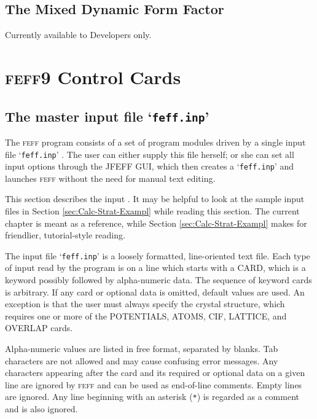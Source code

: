 \documentclass[11pt,oneside]{report} %
\newcommand{\program}[1]{\textsc{#1}}
\newcommand{\feff}{\program{feff}}
\newcommand{\vnum}{9}
\newcommand{\feffcur}{\feff\vnum}
\newcommand{\file}[1]{`\texttt{#1}'}
\begin{document}
\section{The Mixed Dynamic Form Factor}
\label{sec:MDFF}

Currently available to Developers only.



\chapter{{\feffcur} Control Cards}
\label{sec:Input-Control-Cards}

\section{The master input file \file{feff.inp}}

The {\feff} program consists of a set of program modules driven by  a single input file \file{feff.inp} .  The user can either supply this file
 herself; or she can set all input options through the JFEFF GUI, which then
 creates a {\file{feff.inp}} and launches {\feff} without the need for 
 manual text editing.

This section describes the input . It may be helpful to look at the
sample input files in Section \ref{sec:Calc-Strat-Exampl} while
reading this section.  The current chapter is meant as a reference,
while Section \ref{sec:Calc-Strat-Exampl} makes for friendlier, tutorial-style reading.

The input file \file{feff.inp} is a loosely formatted, line-oriented
text file. Each type of input read by the program is on a line which
starts with a CARD, which is a keyword possibly followed by alpha-numeric data.  The sequence of keyword cards is arbitrary. If any card or optional data is omitted,
default values are used.  An exception is that the user must always specify the crystal structure, which requires one or more of the POTENTIALS, ATOMS, CIF, LATTICE, and OVERLAP cards.

Alpha-numeric values are listed in free format,
separated by blanks. Tab characters are not allowed and may cause confusing error
messages. Any characters appearing after the card and its required or
optional data on a given line are ignored by {\feff} and can be used
as end-of-line comments. Empty lines are ignored. Any
line beginning with an asterisk (\texttt{*}) is regarded as a comment
and is also ignored. 
\end{document}
